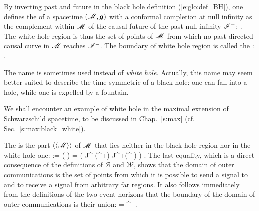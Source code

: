 By inverting past and future in the black hole definition (\ref{e:glo:def_BH}), one defines
the  of a
spacetime $(\mathscr{M},\bm{g})$ with a conformal completion at null infinity as the
complement within $\mathscr{M}$ of the causal future of the past null infinity $\mathscr{I}^-$:
\be \label{e:glo:def_white_hole}
     .
\ee
The white hole region is thus the set of points of $\mathscr{M}$
from which no past-directed causal curve in $\tilde{\mathscr{M}}$ reaches $\mathscr{I}^-$.
The boundary of white hole region is called the
:
\be
     .
\ee

\begin{remark}
The name  is sometimes used
instead of \emph{white hole}. Actually, this name may seem better suited
to describe the time symmetric of a black hole: one can fall into a hole, while
one is expelled by a fountain.
\end{remark}

\begin{example}
We shall encounter an example of white hole in the maximal extension of
Schwarzschild spacetime, to be discussed in Chap.~\ref{s:max} (cf. Sec.~\ref{s:max:black_white}).
\end{example}

The 
is the part $\langle\langle \mathscr{M}\rangle\rangle$ of $\mathscr{M}$ that lies neither
in the black hole region nor in the white hole one:
\be \label{e:glo:def_doc}
    \langle\langle \M\rangle\rangle := \M\setminus (\cup {} )
            = \left( J^-(\scri^+) \cap J^+(\scri^-) \right) \cap \M .
\ee
The last equality, which is a direct consequence of the definitions of
$\mathscr{B}$ and $\mathscr{W}$, shows that the domain of outer communications
is the set of points from which it is possible to send a signal to and to
receive a signal from arbitrary far regions.
It also follows immediately from the definitions of the two event horizons
that the boundary of the domain of outer communications is their union:
\be
    \partial \langle\langle \M\rangle\rangle  = \Hor \cup \Hor^- .
\ee

